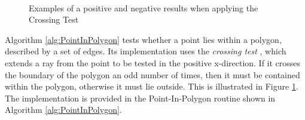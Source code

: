 \begin{figure}[h]%
    \centering
    \\
    \caption{Examples of a positive and negative results when applying the Crossing Test}%
    \label{fig:CrossingTest}%
\end{figure}

Algorithm \ref{alg:PointInPolygon} tests whether a point lies within a polygon, described by a set of edges. Its implementation uses the \textit{crossing test} \cite{Shimrat1962Algorithms}, which extends a ray from the point to be tested in the positive x-direction. If it crosses the boundary of the polygon an odd number of times, then it must be contained within the polygon, otherwise it must lie outside. This is illustrated in Figure \ref{fig:CrossingTest}. The implementation is provided in the Point-In-Polygon routine shown in Algorithm \ref{alg:PointInPolygon}.%


